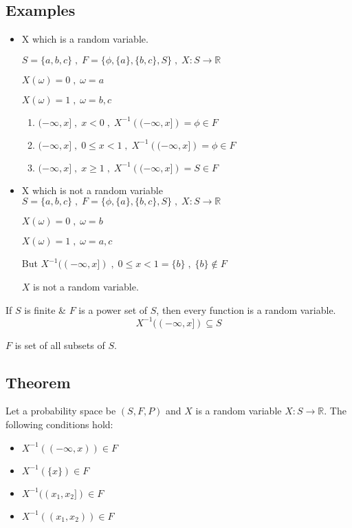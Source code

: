 \documentclass{article}
\begin{document}
\subsection{Examples}
\begin{itemize}
    \item X which is a random variable.

    $S= \{a,b,c\}\; ,\; F=\{ \phi, \{ a\}, \{b,c \}, S\}\; , \; X:S \rightarrow \mathbb{R}$

    $X(\omega) =0\; ,\; \omega =a $

    $X(\omega)= 1\;,\; \omega = b,c$
    \begin{enumerate}
        \item $( -\infty,x]\;,\; x < 0\;,\; X^{-1}\left( (-\infty , x]\right) = \phi \in F$
        \item $( -\infty,x]\;,\; 0 \leq x <1 \;,\; X^{-1}\left( (-\infty , x]\right) = \phi \in F$
        \item $( -\infty,x]\;,\; x \geq 1\;,\; X^{-1}\left( (-\infty , x]\right) = S \in F$
    \end{enumerate}

    \item X which is not a random variable
    $S= \{a,b,c\}\; ,\; F=\{ \phi, \{ a\}, \{b,c \}, S\}\; , \; X:S \rightarrow \mathbb{R}$

    $X(\omega) =0\; ,\; \omega =b $

    $X(\omega)= 1\;,\; \omega = a,c$

    But $X^{-1}((-\infty,x])\; , \;0\leq x<1 = \{b\} \; , \; \{ b\} \notin F$

    $X$ is not a random variable.
\end{itemize}

If $S$ is finite \& $F$ is a power set of $S$, then every function is a random variable.
$$ X^{-1}((-\infty,x]) \subseteq S$$

$F$ is set of all subsets of $S$.

\subsection{Theorem}

Let a probability space be $(S,F,P)$ and $X$ is a random variable $X: S \rightarrow \mathbb{R}$.
The following conditions hold:
\begin{itemize}
    \item $X^{-1}((-\infty,x)) \in F$
    \item $X^{-1} (\{x\}) \in F$
    \item $X^{-1}((x_1 , x_2]) \in F$
    \item $X^{-1} ((x_1,x_2)) \in F$
\end{itemize}
\end{document}
